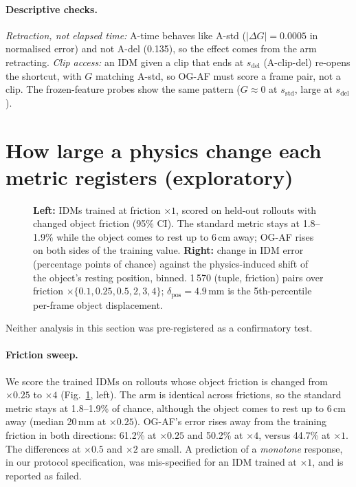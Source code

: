 \documentclass[10pt]{article}
\newcommand{\sstd}{s_{\mathrm{std}}}
\newcommand{\sdel}{s_{\mathrm{del}}}
\begin{document}
\paragraph{Descriptive checks.} \emph{Retraction, not elapsed time:} A-time behaves like
A-std ($|\Delta G|=0.0005$ in normalised error) and not A-del (0.135), so the effect
comes from the arm retracting. \emph{Clip access:} an IDM given a clip that ends at
$\sdel$ (A-clip-del) re-opens the shortcut, with $G$ matching A-std, so OG-AF must score a
frame pair, not a clip. The frozen-feature probes show the same pattern ($G\approx0$ at
$\sstd$, large at $\sdel$).

\section{How large a physics change each metric registers (exploratory)}
\label{sec:resolution}

\begin{figure}[t]
\centering
\begin{minipage}{0.49\linewidth}\end{minipage}\hfill
\begin{minipage}{0.49\linewidth}\end{minipage}
\caption{\textbf{Left:} IDMs trained at friction $\times1$, scored on held-out rollouts
with changed object friction (95\% CI). The standard metric stays at 1.8--1.9\% while
the object comes to rest up to 6\,cm away; OG-AF rises on both sides of the training
value. \textbf{Right:} change in IDM error (percentage points of chance) against the
physics-induced shift of the object's resting position, binned. 1\,570
(tuple, friction) pairs over friction $\times\{0.1,0.25,0.5,2,3,4\}$;
$\delta_{\mathrm{pos}}=4.9$\,mm is the 5th-percentile per-frame object displacement.}
\label{fig:resolution}
\end{figure}

Neither analysis in this section was pre-registered as a confirmatory test.

\paragraph{Friction sweep.} We score the trained IDMs on rollouts whose object friction
is changed from $\times0.25$ to $\times4$ (Fig.~\ref{fig:resolution}, left). The arm is
identical across frictions, so the standard metric stays at 1.8--1.9\% of chance,
although the object comes to rest up to 6\,cm away (median 20\,mm at $\times0.25$).
OG-AF's error rises away from the training friction in both directions: 61.2\% at
$\times0.25$ and 50.2\% at $\times4$, versus 44.7\% at $\times1$. The differences at
$\times0.5$ and $\times2$ are small. A prediction of a \emph{monotone} response, in our
protocol specification, was mis-specified for an IDM trained at $\times1$, and is
reported as failed.
\end{document}
